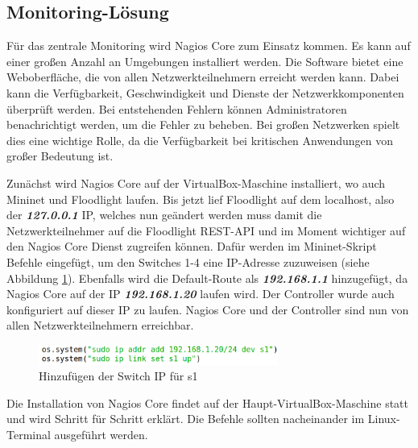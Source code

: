 \documentclass[fontsize=12pt,paper=a4,open=any,parskip=half,
  twoside=false,toc=listof,toc=bibliography,fleqn,leqno,
  captions=nooneline,captions=tableabove,british]{scrbook}
\begin{document}
\subsection{Monitoring-Lösung}
Für das zentrale Monitoring wird Nagios Core zum Einsatz kommen. Es kann auf einer großen Anzahl an Umgebungen installiert werden. Die Software bietet eine Weboberfläche, die von allen Netzwerkteilnehmern erreicht werden kann. Dabei kann die Verfügbarkeit, Geschwindigkeit und Dienste der Netzwerkkomponenten überprüft werden. Bei entstehenden Fehlern können Administratoren benachrichtigt werden, um die Fehler zu beheben. Bei großen Netzwerken spielt dies eine wichtige Rolle, da die Verfügbarkeit bei kritischen Anwendungen von großer Bedeutung ist.\par
Zunächst wird Nagios Core auf der VirtualBox-Maschine installiert, wo auch Mininet und Floodlight laufen. Bis jetzt lief Floodlight auf dem localhost, also der \textit{\textbf{127.0.0.1}} IP, welches nun geändert werden muss damit die Netzwerkteilnehmer auf die Floodlight REST-API und im Moment wichtiger auf den Nagios Core Dienst zugreifen können. Dafür werden im Mininet-Skript Befehle eingefügt, um den Switches 1-4 eine IP-Adresse zuzuweisen (siehe Abbildung \ref{switch}). Ebenfalls wird die Default-Route als \textit{\textbf{192.168.1.1}} hinzugefügt, da Nagios Core auf der IP \textit{\textbf{192.168.1.20}} laufen wird. Der Controller wurde auch konfiguriert auf dieser IP zu laufen. Nagios Core und der Controller sind nun von allen Netzwerkteilnehmern erreichbar.

\begin{figure}[H]
 \centering
 \includegraphics[width=0.7\textwidth]{Bilder/switch}
 \captionsetup{justification=centering, margin=2cm}
 \caption{Hinzufügen der Switch IP für s1}
 \label{switch}
\end{figure}
 
Die Installation von Nagios Core findet auf der Haupt-VirtualBox-Maschine statt und wird Schritt für Schritt erklärt. Die Befehle sollten nacheinander im Linux-Terminal ausgeführt werden.

\newlength\myboxwidth

\setlength{\myboxwidth}{\dimexpr\textwidth-2\fboxsep}
\end{document}
